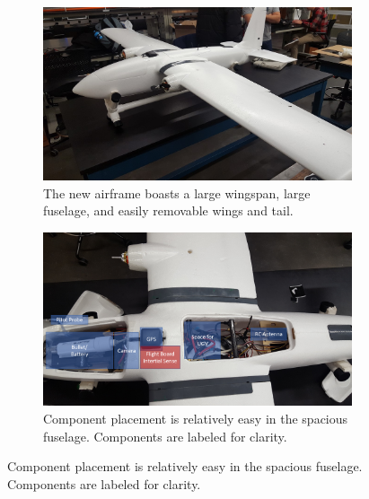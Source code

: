 \documentclass{auvsi_doc}
\begin{document}
\begin{figure}[h!]
\centering
\begin{subfigure}[h]{.49\textwidth}
	\includegraphics[width=1\linewidth]{figs/airframe.jpg}
	\centering
	\caption{The new airframe boasts a large wingspan, large fuselage, and easily removable wings and tail.}
	\label{airframe}
\end{subfigure}
\begin{subfigure}[h]{.49\textwidth}
	\includegraphics[width=1\linewidth]{figs/ComponentPlacement.png}
	\centering
	\caption{Component placement is relatively easy in the spacious fuselage. Components are labeled for clarity.}
	\label{components}
\end{subfigure}
\end{figure}
\end{document}
